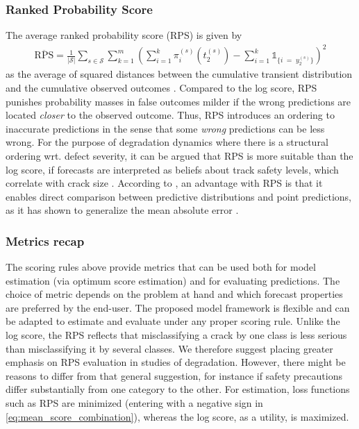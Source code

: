\documentclass{article}
\begin{document}
\subsubsection{Ranked Probability Score}
The average ranked probability score (RPS) is given by
\begin{align}
    \overline{\text{RPS}} =\frac{1}{\vert \mathcal{S} \vert} \sum_{s \in \mathcal{S}} \sum_{k = 1}^m\left( \sum_{i = 1}^k \pi^{(s)}_i\left( t_2^{(s)} \right)  - \sum_{i = 1}^k\mathds{1}_{ \{ i \; = \; y_2^{(s)} \} } \right)^2 \label{eq:RPS}
\end{align}
as the average of squared distances between the cumulative transient distribution and the cumulative observed outcomes \citep{Epstein1969}.
Compared to the log score, RPS punishes probability masses in false outcomes milder if the wrong predictions are located \textit{closer} to the observed outcome. Thus, RPS introduces an ordering to inaccurate predictions in the sense that some \textit{wrong} predictions can be less wrong.
For the purpose of degradation dynamics where there is a structural ordering wrt. defect severity, it can be argued that RPS is more suitable than the log score, if forecasts are interpreted as beliefs about track 
safety levels, which correlate with crack size \citep{UIC_2002_defecthandbook}. 
According to \citet{Czado2009}, an advantage with RPS is that it enables direct comparison between predictive distributions and point predictions, as it has shown to generalize the mean absolute error \citep{Hersbach2000}.



\subsubsection{Metrics recap} \label{sec:metrics_recap}
The scoring rules above provide metrics that can be used both for model estimation (via optimum score estimation) and for evaluating predictions. The choice of metric depends on the problem at hand and which forecast properties are preferred by the end-user. 
The proposed model framework is flexible and can be adapted to estimate and evaluate under any proper scoring rule.
Unlike the log score, the RPS reflects that misclassifying a crack by one class is less serious than misclassifying it by several classes. We therefore suggest placing greater emphasis on RPS evaluation in studies of degradation. 
However, there might be reasons to differ from that general suggestion, for instance if safety precautions differ substantially from one category to the other.
For estimation, loss functions such as RPS are minimized (entering with a negative sign in \cref{eq:mean_score_combination}), whereas the log score, as a utility, is maximized.
\end{document}
